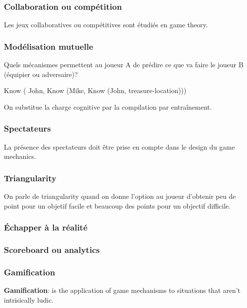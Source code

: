 \subsubsection{Collaboration ou comp\'etition}

Les jeux collaboratives ou comp\'etitives sont \'etudi\'es en game theory.

\subsubsection{Mod\'elisation mutuelle}

Quels m\'ecanismes permettent au joueur A de pr\'edire ce que va faire le joueur B (\'equipier ou adversaire)?

Know ( John, Know (Mike, Know (John, treasure-location)))

On substitue la charge cognitive par la compilation par entra\^inement.

\subsubsection{Spectateurs}

La pr\'esence des spectateurs doit \^etre prise en compte dans le design du game mechanics.

\subsubsection{Triangularity}

On parle de triangularity quand on donne l'option au joueur d'obtenir peu de point pour un objetif facile et beaucoup des points pour un objectif difficile. 

\subsubsection{\'Echapper \`a la r\'ealit\'e}

\subsubsection{Scoreboard ou analytics}

\subsubsection{Gamification}

\textbf{Gamification}: is the application of game mechanisms to situations that aren't intrisically ludic.


